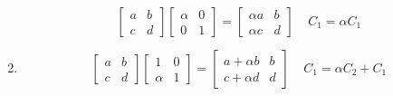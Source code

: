 \documentclass{article}
\begin{document}
\begin{enumerate}
\begin{equation*}
\begin{bmatrix}
        a & b \\
        c & d
    \end{bmatrix}
    \begin{bmatrix}
        \alpha  & 0 \\
        0 & 1
    \end{bmatrix}
    =
    \begin{bmatrix}
        \alpha a & b \\
        \alpha c & d
    \end{bmatrix}
    \;\;\;\;C_1 = \alpha C_1
\end{equation*}
    \item \begin{equation*}    
    \begin{bmatrix}
        a & b \\
        c & d
    \end{bmatrix}
    \begin{bmatrix}
        1  & 0 \\
        \alpha & 1
    \end{bmatrix}
    =
    \begin{bmatrix}
        a + \alpha b & b \\
        c + \alpha d & d
    \end{bmatrix}
    \;\;\;\;C_1 = \alpha C_2 + C_1
\end{equation*}
\end{enumerate}
\pagebreak

\end{document}
